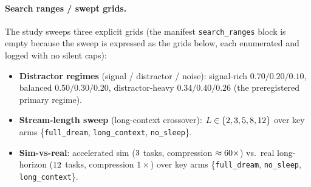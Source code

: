 \paragraph{Search ranges / swept grids.} The study sweeps three explicit grids
(the manifest \texttt{search\_ranges} block is empty because the sweep is
expressed as the grids below, each enumerated and logged with no silent caps):
\begin{itemize}
  \item \textbf{Distractor regimes} (signal / distractor / noise): signal-rich
  $0.70/0.20/0.10$, balanced $0.50/0.30/0.20$, distractor-heavy
  $0.34/0.40/0.26$ (the preregistered primary regime).
  \item \textbf{Stream-length sweep} (long-context crossover):
  $L\in\{2, 3, 5, 8, 12\}$ over key arms
  \{\texttt{full\_dream}, \texttt{long\_context}, \texttt{no\_sleep}\}.
  \item \textbf{Sim-vs-real}: accelerated sim ($3$ tasks,
  compression $\approx60\times$) vs.\ real long-horizon
  ($12$ tasks, compression $1\times$) over key arms
  \{\texttt{full\_dream}, \texttt{no\_sleep}, \texttt{long\_context}\}.
\end{itemize}

